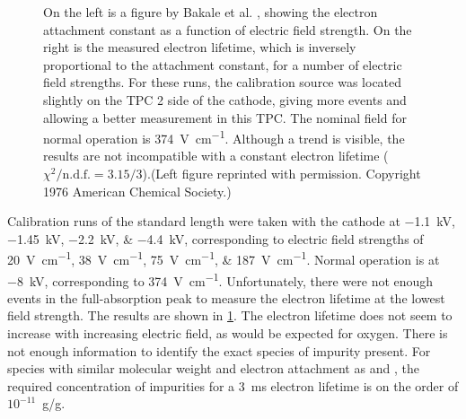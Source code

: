 \documentclass[herrin-thesis.tex]{subfiles}
\begin{document}
\begin{figure}[tbp]
\begin{subfigure}[b]{0.55\linewidth}
\end{subfigure}
\caption[Electron lifetime vs. electric field]{On the left is a figure by Bakale et al. \cite{Bakale:1976ly}, showing the electron attachment constant as a function of electric field strength. On the right is the measured electron lifetime, which is inversely proportional to the attachment constant, for a number of electric field strengths. For these runs, the calibration source was located slightly on the TPC 2 side of the cathode, giving more events and allowing a better measurement in this TPC. The nominal field for normal operation is \SI{374}{\V\per\cm}. Although a trend is visible, the results are not incompatible with a constant electron lifetime (\(\chi^2/\text{n.d.f.} = 3.15/3\)).(Left figure reprinted with permission. Copyright 1976 American Chemical Society.)}
\label{fig:el_attachment_vs_efield}
\label{fig:el_lifetime_vs_efield}
\end{figure}

Calibration runs of the standard length were taken with the cathode at \SIlist{-1.1;-1.45;-2.2;-4.4}{\kilo\V}, corresponding to electric field strengths of \SIlist{20;38;75;187}{\V\per\cm}. Normal operation is at \SI{-8}{\kilo\V}, corresponding to \SI{374}{\V\per\cm}. Unfortunately, there were not enough events in the full-absorption peak to measure the electron lifetime at the lowest field strength. The results are shown in \cref{fig:el_lifetime_vs_efield}. The electron lifetime does not seem to increase with increasing electric field, as would be expected for oxygen. There is not enough information to identify the exact species of impurity present. For species with similar molecular weight and electron attachment as  and , the required concentration of impurities for a \SI{3}{\ms} electron lifetime is on the order of \(10^{-11}\)~\si[per-mode=symbol]{\g\per\g}.

%
%
\end{document}
